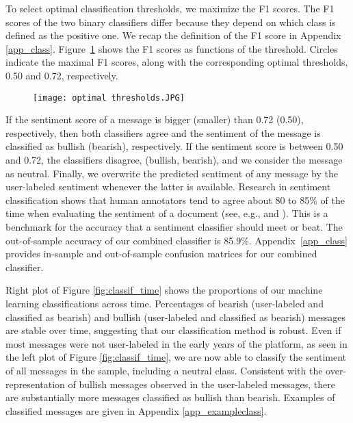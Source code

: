 To select optimal classification thresholds, we maximize the F1 scores. The F1 scores of the two binary classifiers differ because they depend on which class is defined as the positive one. We recap the definition of the F1 score in Appendix \ref{app_class}. Figure~\ref{fig:optimal_thresholds} shows the F1 scores as functions of the threshold. Circles indicate the maximal F1 scores, along with the corresponding optimal thresholds, 0.50 and 0.72, respectively. 

\begin{figure}[h]
    \centering
    \texttt{[image: optimal thresholds.JPG]}
    \label{fig:optimal_thresholds}
\end{figure}

If the sentiment score of a message is bigger (smaller) than 0.72 (0.50), respectively, then both classifiers agree and the sentiment of the message is classified as bullish (bearish), respectively. If the sentiment score is between 0.50 and 0.72, the classifiers disagree, (bullish, bearish), and we consider the message as neutral. Finally, we overwrite the predicted sentiment of any message by the user-labeled sentiment whenever the latter is available. Research in sentiment classification shows that human annotators tend to agree about 80 to 85\% of the time when evaluating the sentiment of a document (see, e.g., \citet{wilson2005recognizing} and \citet{chen2020large}). This is a benchmark for the accuracy that a sentiment classifier should meet or beat. The out-of-sample accuracy of our combined classifier is 85.9\%. Appendix~\ref{app_class} provides in-sample and out-of-sample confusion matrices for our combined classifier.

Right plot of Figure \ref{fig:classif_time} shows the proportions of our machine learning classifications across time. Percentages of bearish (user-labeled and classified as bearish) and bullish (user-labeled and classified as bearish) messages are stable over time, suggesting that our classification method is robust. Even if most messages were not user-labeled in the early years of the platform, as seen in the left plot of Figure \ref{fig:classif_time}, we are now able to classify the sentiment of all messages in the sample, including a neutral class. Consistent with the over-representation of bullish messages observed in the user-labeled messages, there are substantially more messages classified as bullish than bearish. Examples of classified messages are given in Appendix \ref{app_exampleclass}.

